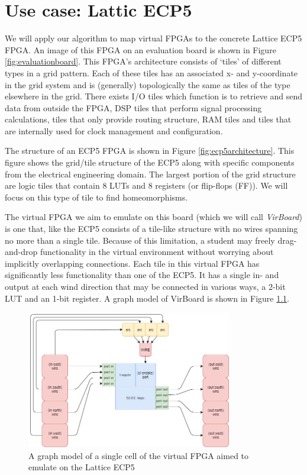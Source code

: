 \chapter{Use case: Lattic ECP5}
We will apply our algorithm to map virtual FPGAs to the concrete Lattice ECP5 FPGA. An image of this FPGA on an evaluation board is shown in Figure \ref{fig:evaluationboard}. This FPGA's architecture consists of `tiles' of different types in a grid pattern. Each of these tiles has an associated x- and y-coordinate in the grid system and is (generally) topologically the same as tiles of the type elsewhere in the grid. There exists I/O tiles which function is to retrieve and send data from outside the FPGA, DSP tiles that perform signal processing calculations, tiles that only provide routing structure, RAM tiles and tiles that are internally used for clock management and configuration.

The structure of an ECP5 FPGA is shown in Figure \ref{fig:ecp5architecture}. This figure shows the grid/tile structure of the ECP5 along with specific components from the electrical engineering domain. The largest portion of the grid structure are logic tiles that contain 8 LUTs and 8 registers (or flip-flops (FF)). We will focus on this type of tile to find homeomorphisms.

The virtual FPGA we aim to emulate on this board (which we will call \textit{VirBoard}) is one that, like the ECP5 consists of a tile-like structure with no wires spanning no more than a single tile. Because of this limitation, a student may freely drag-and-drop functionality in the virtual environment without worrying about implicitly overlapping connections. Each tile in this virtual FPGA has significantly less functionality than one of the ECP5. It has a single in- and output at each wind direction that may be connected in various ways, a 2-bit LUT and an 1-bit register. A graph model of VirBoard is shown in Figure \ref{fig:virboard}.

\begin{figure}
\centering
\includegraphics[width=0.8\textwidth]{images/virtualFPGA.png}
\caption{A graph model of a single cell of the virtual FPGA aimed to emulate on the Lattice ECP5}
\label{fig:virboard}
\end{figure}	


